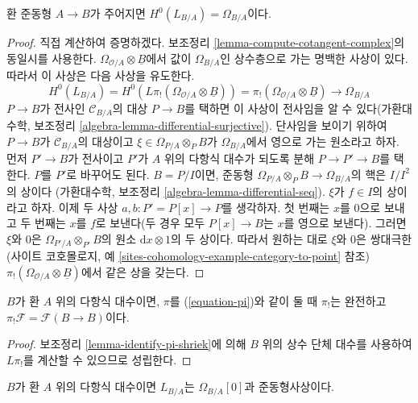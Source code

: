 \begin{lemma}
\label{lemma-identify-H0}
환 준동형 $A\to B$가 주어지면 $H^0(L_{B/A})=\Omega_{B/A}$이다.
\end{lemma}

\begin{proof}
직접 계산하여 증명하겠다. 보조정리
\ref{lemma-compute-cotangent-complex}의 동일시를 사용한다.
$\Omega_{\mathcal{O}/A}\otimes\underline{B}$에서 값이
$\Omega_{B/A}$인 상수층으로 가는 명백한 사상이 있다. 따라서 이 사상은
다음 사상을 유도한다.
$$
H^0(L_{B/A}) = H^0(L\pi_!(\Omega_{\mathcal{O}/A} \otimes \underline{B}))
= \pi_!(\Omega_{\mathcal{O}/A} \otimes \underline{B}) \to \Omega_{B/A}
$$
$P\to B$가 전사인 $\mathcal{C}_{B/A}$의 대상 $P\to B$를 택하면 이
사상이 전사임을 알 수 있다(가환대수학, 보조정리
\ref{algebra-lemma-differential-surjective}). 단사임을 보이기 위하여
$P\to B$가 $\mathcal{C}_{B/A}$의 대상이고
$\xi\in\Omega_{P/A}\otimes_PB$가 $\Omega_{B/A}$에서 영으로 가는
원소라고 하자. 먼저 $P'\to B$가 전사이고 $P'$가 $A$ 위의 다항식
대수가 되도록 분해 $P\to P'\to B$를 택한다. $P$를 $P'$로 바꾸어도
된다. $B=P/I$이면, 준동형
$\Omega_{P/A}\otimes_PB\to\Omega_{B/A}$의 핵은 $I/I^2$의 상이다
(가환대수학, 보조정리 \ref{algebra-lemma-differential-seq}).
$\xi$가 $f\in I$의 상이라고 하자. 이제 두 사상
$a,b:P'=P[x]\to P$를 생각하자. 첫 번째는 $x$를 $0$으로 보내고 두
번째는 $x$를 $f$로 보낸다(두 경우 모두 $P[x]\to B$는 $x$를 영으로
보낸다). 그러면 $\xi$와 $0$은 $\Omega_{P'/A}\otimes_{P'}B$의 원소
$\text{d}x\otimes1$의 두 상이다. 따라서 원하는 대로 $\xi$와 $0$은
쌍대극한(사이트 코호몰로지, 예
\ref{sites-cohomology-example-category-to-point} 참조)
$\pi_!(\Omega_{\mathcal{O}/A}\otimes\underline{B})$에서 같은 상을 갖는다.
\end{proof}

\begin{lemma}
\label{lemma-pi-lower-shriek-polynomial-algebra}
$B$가 환 $A$ 위의 다항식 대수이면, $\pi$를 (\ref{equation-pi})와 같이
둘 때 $\pi_!$는 완전하고 $\pi_!\mathcal{F}=\mathcal{F}(B\to B)$이다.
\end{lemma}

\begin{proof}
보조정리 \ref{lemma-identify-pi-shriek}에 의해 $B$ 위의 상수 단체 대수를
사용하여 $L\pi_!$를 계산할 수 있으므로 성립한다.
\end{proof}

\begin{lemma}
\label{lemma-cotangent-complex-polynomial-algebra}
$B$가 환 $A$ 위의 다항식 대수이면 $L_{B/A}$는
$\Omega_{B/A}[0]$과 준동형사상이다.
\end{lemma}

